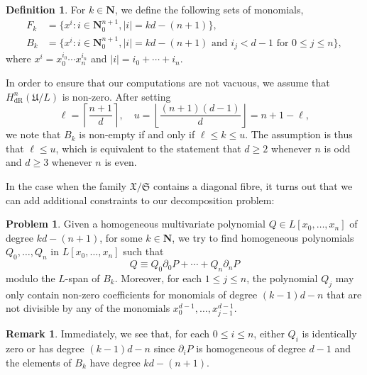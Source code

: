 \documentclass[a4paper,11pt]{article}
\numberwithin{equation}{section}
\providecommand{\abs}[1]{\lvert#1\rvert}                 %
\providecommand{\floor}[1]{\left\lfloor#1\right\rfloor}   %
\providecommand{\ceil}[1]{\left\lceil#1\right\rceil}   %
\newcommand{\NN}{\mathbf{N}} %
\providecommand{\HdR}{H_{\text{dR}}}    %
\theoremstyle{definition}
\newtheorem{defn}[thm]{Definition}
\newtheorem{rem}[thm]{Remark}
\newtheorem{prob}[thm]{Problem}
\begin{document}
\begin{defn} \label{defn:MonBasis}
For $k \in \NN$, we define the following sets of monomials, 
\begin{align*}
F_k & = \{ x^i : i \in \mathbf{N}_{0}^{n+1}, \abs{i} = k d - (n+1) \}, \\
B_k & = \{ x^i : i \in \mathbf{N}_{0}^{n+1}, \abs{i} = k d - (n+1) \text{ and $i_j < d-1$ for $0 \leq j \leq n$}\},
\end{align*}
where $x^i = x_0^{i_0} \dotsm x_n^{i_n}$ and 
$\abs{i} = i_0 + \dotsb + i_n$.
\end{defn}

In order to ensure that our computations are not vacuous, we assume 
that $\HdR^n(\mathfrak{U}/L)$ is non-zero.  After setting 
\begin{equation}
\ell = \ceil{\frac{n+1}{d}}, \quad u = \floor{\frac{(n+1)(d-1)}{d}} = n+1 - \ell,
\end{equation}
we note that $B_k$ is non-empty if and only if $\ell \leq k \leq u$.  The 
assumption is thus that $\ell \leq u$, which is equivalent to the statement 
that $d \geq 2$ whenever $n$ is odd and $d \geq 3$ whenever $n$ is even.

In the case when the family $\mathfrak{X}/\mathfrak{S}$ contains a 
diagonal fibre, it turns out that we can add additional constraints 
to our decomposition problem:

\begin{prob} \label{prob:Decomposition}
Given a homogeneous multivariate polynomial $Q \in L[x_0, \dotsc, x_n]$ 
of degree \mbox{$k d - (n + 1)$}, for some $k \in \NN$, we try to find 
homogeneous polynomials $Q_0, \dotsc, Q_n$ in $L[x_0, \dotsc, x_n]$ such 
that 
\begin{equation} \label{eq:Decomposition}
Q \equiv Q_0 \partial_0 P + \dotsb + Q_n \partial_n P
\end{equation}
modulo the $L$-span of $B_k$.  Moreover, for each $1 \leq j \leq n$,  the 
polynomial $Q_j$ may only contain non-zero coefficients for monomials of 
degree $(k-1)d-n$ that are not divisible by any of the monomials 
$x_0^{d-1}, \dotsc, x_{j-1}^{d-1}$.
\end{prob}

\begin{rem}
Immediately, we see that, for each $0 \leq i \leq n$, either $Q_i$ is 
identically zero or has degree $(k - 1) d - n$ since $\partial_i P$ is 
homogeneous of degree $d - 1$ and the elements of $B_k$ have degree 
$kd - (n+1)$.
\end{rem}
\end{document}
